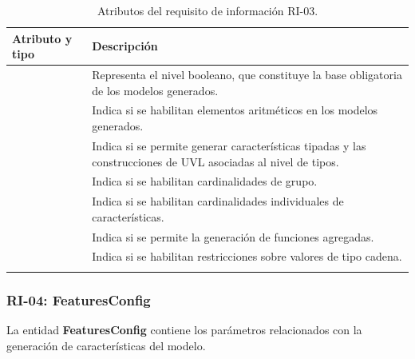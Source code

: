 \begin{longtable}{@{}P{5.3cm} P{\dimexpr\textwidth-5.3cm-2\tabcolsep\relax}@{}}
\toprule
\textbf{Atributo y tipo} & \textbf{Descripción} \\
\midrule
\endhead

 &
Representa el nivel booleano, que constituye la base obligatoria
de los modelos generados. \\

\midrule
{} & Indica si se habilitan elementos aritméticos en los modelos generados. \\

\midrule
{} &
Indica si se permite generar características tipadas y las
construcciones de UVL asociadas al nivel de tipos. \\

\midrule
{} & Indica si se habilitan cardinalidades de grupo. \\

\midrule
{} & Indica si se habilitan cardinalidades individuales de características. \\

\midrule
{} & Indica si se permite la generación de funciones agregadas. \\

\midrule
{} & Indica si se habilitan restricciones sobre valores de tipo cadena. \\

\bottomrule
\caption{Atributos del requisito de información RI-03.}
\label{tab:ri-level-config}
\end{longtable}


\subsubsection*{RI-04: \textbf{FeaturesConfig}}

La entidad \textbf{FeaturesConfig} contiene los parámetros relacionados con la generación de características del modelo.

